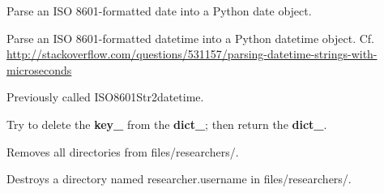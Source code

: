 \documentclass[letterpaper,10pt,english]{sphinxmanual}
\begin{document}

\begin{fulllineitems}
\label{api:old.lib.utils.dateString2date}
Parse an ISO 8601-formatted date into a Python date object.

\end{fulllineitems}


\begin{fulllineitems}
\label{api:old.lib.utils.datetimeString2datetime}
Parse an ISO 8601-formatted datetime into a Python datetime object.
Cf. \href{http://stackoverflow.com/questions/531157/parsing-datetime-strings-with-microseconds}{http://stackoverflow.com/questions/531157/parsing-datetime-strings-with-microseconds}

Previously called ISO8601Str2datetime.

\end{fulllineitems}


\begin{fulllineitems}
\label{api:old.lib.utils.deleteKey}
Try to delete the {\color{red}\bfseries{}key\_} from the {\color{red}\bfseries{}dict\_}; then return the {\color{red}\bfseries{}dict\_}.

\end{fulllineitems}


\begin{fulllineitems}
\label{api:old.lib.utils.destroyAllResearcherDirectories}
Removes all directories from files/researchers/.

\end{fulllineitems}


\begin{fulllineitems}
\label{api:old.lib.utils.destroyResearcherDirectory}
Destroys a directory named researcher.username in files/researchers/.

\end{fulllineitems}
\end{document}
